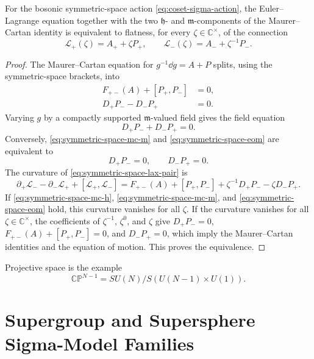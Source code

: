 \begin{lemma}
\label{lem:symmetric-space-lax-equivalence}
For the bosonic symmetric-space action \eqref{eq:coset-sigma-action}, the
Euler--Lagrange equation together with the two \(\mathfrak h\)- and
\(\mathfrak m\)-components of the Maurer--Cartan identity is equivalent to
flatness, for every \(\zeta\in\mathbb C^\times\), of the connection
\begin{equation}
  \mathcal L_+(\zeta)=A_+ +\zeta P_+,\qquad
  \mathcal L_-(\zeta)=A_- +\zeta^{-1}P_- .
  \label{eq:symmetric-space-lax-pair}
\end{equation}
\end{lemma}

\begin{proof}
The Maurer--Cartan equation for \(g^{-1}\dd g=A+P\) splits, using the
symmetric-space brackets, into
\begin{align}
  F_{+-}(A)+[P_+,P_-]&=0,
  \label{eq:symmetric-space-mc-h}\\
  D_+P_- -D_-P_+&=0 .
  \label{eq:symmetric-space-mc-m}
\end{align}
Varying \(g\) by a compactly supported \(\mathfrak m\)-valued field gives the
field equation
\begin{equation}
  D_+P_-+D_-P_+=0 .
  \label{eq:symmetric-space-eom}
\end{equation}
Conversely, \eqref{eq:symmetric-space-mc-m} and
\eqref{eq:symmetric-space-eom} are equivalent to
\[
  D_+P_-=0,\qquad D_-P_+=0 .
\]
The curvature of \eqref{eq:symmetric-space-lax-pair} is
\[
  \partial_+\mathcal L_- -\partial_-\mathcal L_+
  +[\mathcal L_+,\mathcal L_-]
  =
  F_{+-}(A)+[P_+,P_-]
  +\zeta^{-1}D_+P_- -\zeta D_-P_+ .
\]
If \eqref{eq:symmetric-space-mc-h}, \eqref{eq:symmetric-space-mc-m}, and
\eqref{eq:symmetric-space-eom} hold, this curvature vanishes for all
\(\zeta\).  If the curvature vanishes for all
\(\zeta\in\mathbb C^\times\), the coefficients of \(\zeta^{-1}\),
\(\zeta^0\), and \(\zeta\) give \(D_+P_-=0\),
\(F_{+-}(A)+[P_+,P_-]=0\), and \(D_-P_+=0\), which imply the
Maurer--Cartan identities and the equation of motion.  This proves the
equivalence.
\end{proof}

Projective space is the example
\[
  \mathbb{CP}^{N-1}=SU(N)/S(U(N-1)\times U(1)).
\]

\section{Supergroup and Supersphere Sigma-Model Families}
\label{sec:supergroup-supersphere-sigma-models}

